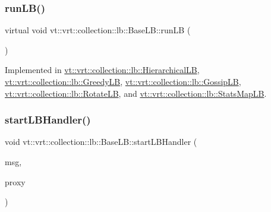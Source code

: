 \mbox{\label{structvt_1_1vrt_1_1collection_1_1lb_1_1_base_l_b_a69a398c54f8129f365171a1189ffcd84}} 
\subsubsection{\texorpdfstring{run\+L\+B()}{runLB()}}
{\footnotesize\ttfamily virtual void vt\+::vrt\+::collection\+::lb\+::\+Base\+L\+B\+::run\+LB (\begin{DoxyParamCaption}{ }\end{DoxyParamCaption})\hspace{0.3cm}{\ttfamily [pure virtual]}}



Implemented in \hyperlink{structvt_1_1vrt_1_1collection_1_1lb_1_1_hierarchical_l_b_a6affae1554d9c0734db0d538b9b26e4d}{vt\+::vrt\+::collection\+::lb\+::\+Hierarchical\+LB}, \hyperlink{structvt_1_1vrt_1_1collection_1_1lb_1_1_greedy_l_b_ab5e726f6fe7aa749ea6e0e2a45171d36}{vt\+::vrt\+::collection\+::lb\+::\+Greedy\+LB}, \hyperlink{structvt_1_1vrt_1_1collection_1_1lb_1_1_gossip_l_b_a06116496c3146be18c56379775f8715d}{vt\+::vrt\+::collection\+::lb\+::\+Gossip\+LB}, \hyperlink{structvt_1_1vrt_1_1collection_1_1lb_1_1_rotate_l_b_a853cb29e5dbe8164ad96a33fade9cc44}{vt\+::vrt\+::collection\+::lb\+::\+Rotate\+LB}, and \hyperlink{structvt_1_1vrt_1_1collection_1_1lb_1_1_stats_map_l_b_a20a7bd354dcaca4393c66034be3b4083}{vt\+::vrt\+::collection\+::lb\+::\+Stats\+Map\+LB}.

\mbox{\label{structvt_1_1vrt_1_1collection_1_1lb_1_1_base_l_b_a26d684f9f07e7635886b12d0235e081e}} 
\subsubsection{\texorpdfstring{start\+L\+B\+Handler()}{startLBHandler()}}
{\footnotesize\ttfamily void vt\+::vrt\+::collection\+::lb\+::\+Base\+L\+B\+::start\+L\+B\+Handler (\begin{DoxyParamCaption}\item[{\hyperlink{structvt_1_1vrt_1_1collection_1_1balance_1_1_start_l_b_msg}{balance\+::\+Start\+L\+B\+Msg} $\ast$}]{msg,  }\item[{\hyperlink{structvt_1_1objgroup_1_1proxy_1_1_proxy}{objgroup\+::proxy\+::\+Proxy}$<$ \hyperlink{structvt_1_1vrt_1_1collection_1_1lb_1_1_base_l_b}{Base\+LB} $>$}]{proxy }\end{DoxyParamCaption})}

